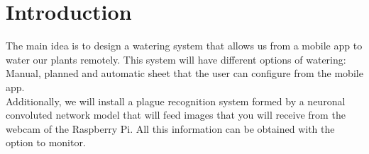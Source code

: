 \documentclass[11pt,a4paper]{article}
\begin{document}
\renewcommand{\headrulewidth}{0.5pt}
\renewcommand{\footrulewidth}{0.5pt}
\fancypagestyle{plain}{
\fancyhead[L]{}
\fancyhead[C]{}
\fancyhead[R]{\thepage}
\fancyfoot[L]{}
\fancyfoot[C]{}
\fancyfoot[R]{}
\renewcommand{\headrulewidth}{0pt}
\renewcommand{\footrulewidth}{0pt}
}
\pagestyle{fancy}
\vspace*{0.05in}

\tableofcontents

\newpage

\vspace*{0.3in}
\listoftables
\listoffigures
\newpage

\part*{Introduction}
	
The main idea is to design a watering system that allows us from a mobile app to water our plants remotely. This system will have different options of watering: Manual, planned and automatic sheet that the user can configure from the mobile app.\\

Additionally, we will install a plague recognition system formed by a neuronal convoluted network model that will feed images that you will receive from the webcam of the Raspberry Pi. All this information can be obtained with the option to monitor.\\
\end{document}
